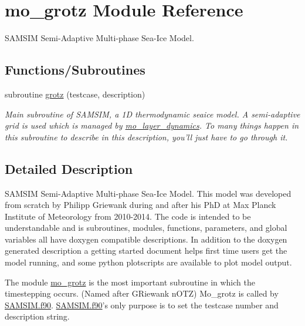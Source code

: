 \hypertarget{namespacemo__grotz}{
\section{mo\_\-grotz Module Reference}
\label{namespacemo__grotz}
}


SAMSIM Semi-\/Adaptive Multi-\/phase Sea-\/Ice Model.  


\subsection*{Functions/Subroutines}
\begin{DoxyCompactItemize}
\item 
subroutine \hyperlink{namespacemo__grotz_a48ebd3aa83db1cb4087b1841142ec9bd}{grotz} (testcase, description)
\begin{DoxyCompactList}\small\item\em Main subroutine of SAMSIM, a 1D thermodynamic seaice model. A semi-\/adaptive grid is used which is managed by \hyperlink{namespacemo__layer__dynamics}{mo\_\-layer\_\-dynamics}. To many things happen in this subroutine to describe in this description, you'll just have to go through it. \item\end{DoxyCompactList}\end{DoxyCompactItemize}


\subsection{Detailed Description}
SAMSIM Semi-\/Adaptive Multi-\/phase Sea-\/Ice Model. This model was developed from scratch by Philipp Griewank during and after his PhD at Max Planck Institute of Meteorology from 2010-\/2014. The code is intended to be understandable and is subroutines, modules, functions, parameters, and global variables all have doxygen compatible descriptions. In addition to the doxygen generated description a getting started document helps first time users get the model running, and some python plotscripts are available to plot model output.

The module \hyperlink{namespacemo__grotz}{mo\_\-grotz} is the most important subroutine in which the timestepping occurs. (Named after GRiewank nOTZ) Mo\_\-grotz is called by \hyperlink{SAMSIM_8f90}{SAMSIM.f90}. \hyperlink{SAMSIM_8f90}{SAMSIM.f90}'s only purpose is to set the testcase number and description string.

